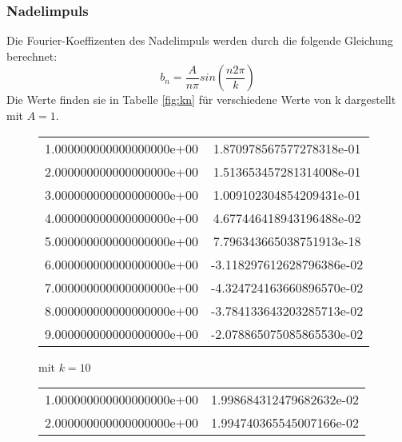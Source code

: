 \subsubsection{Nadelimpuls}
  Die Fourier-Koeffizenten des Nadelimpuls werden durch die folgende Gleichung berechnet:
  \begin{equation}
    b_n = \frac{A}{n\pi} sin\left(\frac{n2\pi}{k}\right)
  \end{equation}
  Die Werte finden sie in Tabelle \ref{fig:kn} für verschiedene Werte von k dargestellt mit $A=1$.
\begin{table}
  \centering
  \caption{Fourier-Koeffizenten eines Nadelimpulses}
  \label{fig:kn}
  \begin{subfigure}{0.48\textwidth}
    \centering
  \label{fig:kn10}
  \begin{tabular}{S[round-precision = 0] S}
    \toprule
      &  \\
    \midrule
    1.000000000000000000e+00 & 1.870978567577278318e-01\\
    2.000000000000000000e+00 & 1.513653457281314008e-01\\
    3.000000000000000000e+00 & 1.009102304854209431e-01\\
    4.000000000000000000e+00 & 4.677446418943196488e-02\\
    5.000000000000000000e+00 & 7.796343665038751913e-18\\
    6.000000000000000000e+00 & -3.118297612628796386e-02\\
    7.000000000000000000e+00 & -4.324724163660896570e-02\\
    8.000000000000000000e+00 & -3.784133643203285713e-02\\
    9.000000000000000000e+00 & -2.078865075085865530e-02\\
    \bottomrule
  \end{tabular}
  \caption{mit $k = 10$}
\end{subfigure}
  \begin{subfigure}{0.48\textwidth}
    \centering
  \label{fig:kn100}
  \begin{tabular}{S[round-precision = 0] S}
    \toprule
      &  \\
    \midrule
    1.000000000000000000e+00 & 1.998684312479682632e-02\\
    2.000000000000000000e+00 & 1.994740365545007166e-02\\

\end{tabular}
\end{subfigure}
\end{table}
